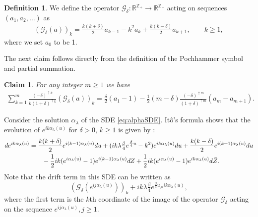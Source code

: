 \documentclass[12pt]{article}
\newtheorem{claim}[theorem]{Claim}
\theoremstyle{definition} %
\newtheorem{definition}[theorem]{Definition}
\newcommand{\ZZ}{{\mathbb Z}}
\newcommand{\R}{{\mathbb R}}
\theoremstyle{remark} %
\newcommand{\cG}{{\mathcal G}}
\newcommand{\coeff}{c}
\newcommand{\benedek}[1]{\textcolor{red}{\tt{#1}}}
\begin{document}
\begin{definition}\label{def:Gd}
We define the operator $\cG_\delta:\R^{\ZZ_{+}}\to \R^{\ZZ_{+}}$ acting on sequences $(a_1,a_2,\dots)$ as 
\begin{align}\label{def:G_delta}
    \left(\cG_\delta(a)\right)_k=\frac{k(k+\delta)}{2}a_{k-1}-k^2 a_k+\frac{k(k-\delta)}{2} a_{k+1}, \qquad k\ge 1,
\end{align}
where we set $a_0$ to be 1. 
\end{definition}


The next claim follows directly from the definition of the Pochhammer symbol and partial summation. 
\begin{claim} \label{cl:partial_sum} For any integer $m\ge 1$ we have
    \begin{align}
          \sum_{k=1}^m \frac{(-\delta)^{\uparrow k}}{k (1+\delta)^{\uparrow k}}\left(\cG_\delta (a)\right)_k=\frac{\delta}{2}(a_1-1)-\frac{1}{2}(m-\delta) \frac{(-\delta)^{\uparrow m}}{ (1+\delta)^{\uparrow m}}(a_m-a_{m+1}).
    \end{align}
\end{claim}



Consider the solution $\alpha_\lambda$ of the SDE \eqref{eq:alphaSDE}. It\^{o}'s formula shows that  the evolution of $e^{i k \alpha_\lambda(u)}$ for $\delta>0$, $k\ge 1$ is given by :  
\begin{align}\notag
 d e^{i k\alpha_\lambda(u)}&=\frac{k(k+\delta)}{2} e^{i (k-1)\alpha_\lambda(u)} du+(i k \lambda \tfrac{\beta}{4}e^{\frac{\beta}{4}u}-k^2) e^{i k \alpha_\lambda(u)} du+\frac{k(k-\delta)}{2} e^{i (k+1)\alpha_\lambda(u)}du  \\
 &\qquad -\frac{1}{2} i  k (e^{i \alpha_\lambda(u)}-1) e^{i(k-1)\alpha_\lambda(u)} dZ+\frac{1}{2} i  k (e^{i \alpha_\lambda(u)}-1) e^{i k \alpha_\lambda(u)} d\bar Z. \label{eq:QkSDE}
\end{align}
Note that the drift term in this SDE can be written as 
\[
 \left(\cG_\delta(e^{i j \alpha_\lambda(u)})\right)_k+i k \lambda \tfrac{\beta}{4}e^{\frac{\beta}{4}u} e^{i k \alpha_\lambda(u)},
\]
where the first term is the $k$th coordinate of the image of the operator $\cG_\delta$ acting on the sequence $e^{i j \alpha_\lambda(u)}, j\ge 1$.
\end{document}
